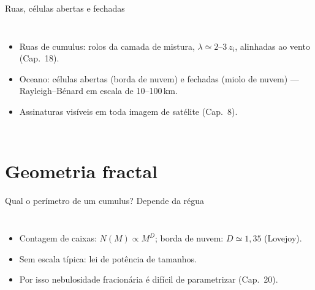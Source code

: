 \documentclass[aspectratio=169,11pt]{beamer}
\begin{document}
\begin{frame}{Ruas, células abertas e fechadas}
  \begin{columns}
    \begin{itemize}
      \item Ruas de cumulus: rolos da camada de mistura,
            $\lambda \simeq 2$--$3\,z_i$, alinhadas ao vento
            (Cap.~18).
      \item Oceano: células \alert{abertas} (borda de nuvem) e
            \alert{fechadas} (miolo de nuvem) — Rayleigh--Bénard em
            escala de 10--100\,km.
      \item Assinaturas visíveis em toda imagem de satélite (Cap.~8).
    \end{itemize}
  \end{columns}
\end{frame}

\section{Geometria fractal}

\begin{frame}{Qual o perímetro de um cumulus? Depende da régua}
  \begin{columns}
    \begin{itemize}
      \item Contagem de caixas: $N(M) \propto M^{D}$; borda de nuvem:
            $D \simeq 1{,}35$ (Lovejoy).
      \item Sem escala típica: lei de potência de tamanhos.
      \item Por isso nebulosidade fracionária é difícil de
            parametrizar (Cap.~20).
    \end{itemize}
  \end{columns}
\end{frame}
\end{document}
